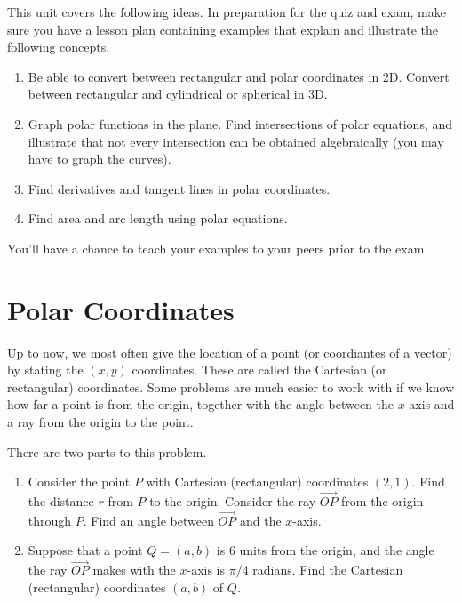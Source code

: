 
\noindent 
This unit covers the following ideas. In preparation for the quiz and exam, make sure you have a lesson plan containing examples that explain and illustrate the following concepts.  
\begin{enumerate}

\item Be able to convert between rectangular and polar coordinates in 2D. Convert between rectangular and cylindrical or spherical in 3D. 
\item Graph polar functions in the plane. Find intersections of polar equations, and illustrate that not every intersection can be obtained algebraically (you may have to graph the curves).
\item Find derivatives and tangent lines in polar coordinates.
\item Find area and arc length using polar equations.

\end{enumerate}
You'll have a chance to teach your examples to your peers prior to the exam.

\section{Polar Coordinates}
Up to now, we most often give the location of a point (or coordiantes of a vector) by stating the $(x,y)$ coordinates.  These are called the Cartesian (or rectangular) coordinates.  Some problems are much easier to work with if we know how far a point is from the origin, together with the angle between the $x$-axis and a ray from the origin to the point.

\begin{problem}
%
There are two parts to this problem.
\begin{enumerate}
\item Consider the point $P$ with Cartesian (rectangular) coordinates $(2,1)$.  Find the distance $r$ from $P$ to the origin. Consider the ray $\vec {OP}$ from the origin through $P$. Find an angle between $\vec{OP}$ and the $x$-axis. 

\item Suppose that a point $Q=(a,b)$ is 6 units from the origin, and the angle the ray $\vec {OP}$ makes with the $x$-axis is $\pi/4$ radians.  Find the Cartesian (rectangular) coordinates $(a,b)$ of $Q$.
\end{enumerate}

 
\end{problem}

